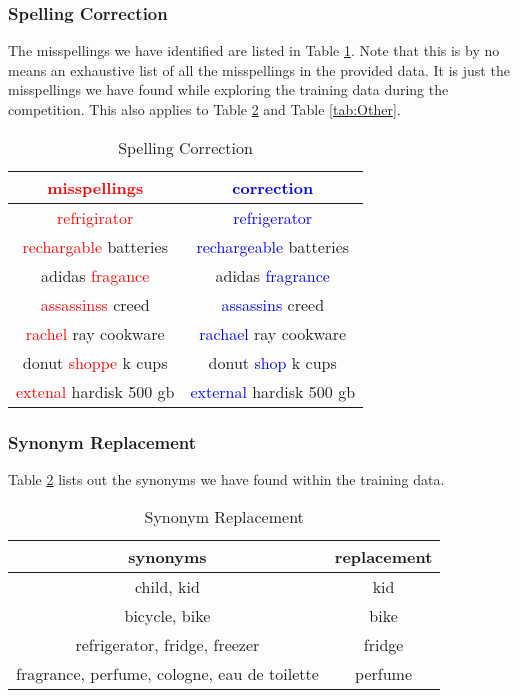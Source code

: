 \documentclass[12pt]{article}
\begin{document}
\subsubsection{Spelling Correction}
The misspellings we have identified are listed in Table \ref{tab:spelling_correction}. Note that this is by no means an exhaustive list of all the misspellings in the provided data. It is just the misspellings we have found while exploring the training data during the competition. This also applies to Table \ref{tab:synonym} and Table \ref{tab:Other}.
\begin{table}[!htb]
\centering
\caption{Spelling Correction}
\label{tab:spelling_correction}
\begin{tabular}{|c|c|}
\hline
\textcolor{red}{misspellings} & \textcolor{blue}{correction} \\
\hline\hline
\textcolor{red}{refrigirator} & \textcolor{blue}{refrigerator} \\
\textcolor{red}{rechargable} batteries & \textcolor{blue}{rechargeable} batteries \\
adidas \textcolor{red}{fragance} & adidas \textcolor{blue}{fragrance}\\
\textcolor{red}{assassinss} creed & \textcolor{blue}{assassins} creed\\
\textcolor{red}{rachel} ray cookware & \textcolor{blue}{rachael} ray cookware \\
donut \textcolor{red}{shoppe} k cups & donut \textcolor{blue}{shop} k cups \\
\textcolor{red}{extenal} hardisk 500 gb & \textcolor{blue}{external} hardisk 500 gb \\
\hline
\end{tabular}
\end{table}

\subsubsection{Synonym Replacement}
Table \ref{tab:synonym} lists out the synonyms we have found within the training data.
\begin{table}[!htb]
\centering
\caption{Synonym Replacement}
\label{tab:synonym}
\begin{tabular}{|c|c|}
\hline
synonyms & replacement\\
\hline\hline
child, kid & kid\\
bicycle, bike & bike\\
refrigerator, fridge, freezer & fridge\\
fragrance, perfume, cologne, eau de toilette & perfume\\
\hline
\end{tabular}
\end{table}
\end{document}
